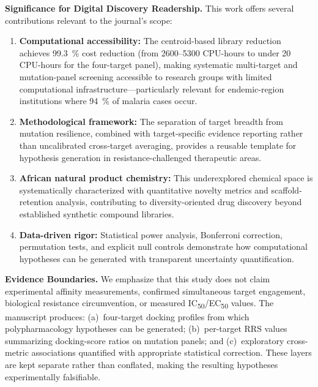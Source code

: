\documentclass[11pt,letterpaper]{article}
\begin{document}
\vspace{0.3em}

\noindent\textbf{Significance for Digital Discovery Readership.}
This work offers several contributions relevant to the journal's scope:

\begin{enumerate}[leftmargin=*]
\item \textbf{Computational accessibility:} The centroid-based library reduction achieves \qty{99.3}{\percent} cost reduction (from \numrange{2600}{5300} CPU-hours to under 20 CPU-hours for the four-target panel), making systematic multi-target and mutation-panel screening accessible to research groups with limited computational infrastructure---particularly relevant for endemic-region institutions where \qty{94}{\percent} of malaria cases occur.

\item \textbf{Methodological framework:} The separation of target breadth from mutation resilience, combined with target-specific evidence reporting rather than uncalibrated cross-target averaging, provides a reusable template for hypothesis generation in resistance-challenged therapeutic areas.

\item \textbf{African natural product chemistry:} This underexplored chemical space is systematically characterized with quantitative novelty metrics and scaffold-retention analysis, contributing to diversity-oriented drug discovery beyond established synthetic compound libraries.

\item \textbf{Data-driven rigor:} Statistical power analysis, Bonferroni correction, permutation tests, and explicit null controls demonstrate how computational hypotheses can be generated with transparent uncertainty quantification.
\end{enumerate}

\vspace{0.3em}

\noindent\textbf{Evidence Boundaries.}
We emphasize that this study does not claim experimental affinity measurements, confirmed simultaneous target engagement, biological resistance circumvention, or measured IC\textsubscript{50}/EC\textsubscript{50} values. The manuscript produces: (a)~four-target docking profiles from which polypharmacology hypotheses can be generated; (b)~per-target RRS values summarizing docking-score ratios on mutation panels; and (c)~exploratory cross-metric associations quantified with appropriate statistical correction. These layers are kept separate rather than conflated, making the resulting hypotheses experimentally falsifiable.
\end{document}
